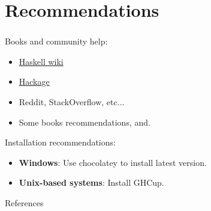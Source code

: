 \documentclass{beamer}
\theoremstyle{definition}
\theoremstyle{remark}
\theoremstyle{example}
\newif\ifinsection
\newif\ifinsubsection
\let\oldsection\section
\renewcommand{\section}{
  \global\insectiontrue
  \global\insubsectionfalse
  \oldsection}
\newcommand {\aframe}[1] {
  \begin{frame}
    \ifinsection\frametitle{\secname}\fi
    \ifinsubsection\framesubtitle{\subsecname}\fi
  #1
  \end{frame}
}
\begin{document}
\section{Recommendations}
\aframe{Books and community help:
  \begin{itemize}
    \item \href{https://wiki.haskell.org/Haskell}{Haskell wiki}
    \item \href{https://hackage.haskell.org/}{Hackage}
    \item Reddit, StackOverflow, etc...
    \item Some books recommendations\textcite{lipovaca2011},%
      \textcite{hutton2016} and\textcite{osullivan2008}.
  \end{itemize}
  \vspace{1cm}
  Installation recommendations:
  \begin{itemize}
    \item \textbf{Windows}: Use chocolatey to install latest version.
    \item \textbf{Unix-based systems}: Install GHCup.
  \end{itemize}
}

\begin{frame}[allowframebreaks]{References}
  \printbibliography
\end{frame}

\begin{frame}
  \begin{minipage}[t][.8\textheight]{\textwidth}
    \vfill
    \begin{center}
         \\
         \\
    \end{center}
  \end{minipage}
\end{frame}
\end{document}
